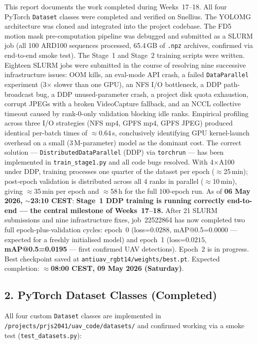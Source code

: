 This report documents the work completed during Weeks~17--18. All four
PyTorch \texttt{Dataset} classes were completed and verified on
Snellius. The YOLOMG architecture was cloned and integrated into the
project codebase. The FD5 motion mask pre-computation pipeline was
debugged and submitted as a SLURM job (all 100 ARD100 sequences
processed, 65.4\,GB of \texttt{.npz} archives, confirmed via
end-to-end smoke test). The Stage~1 and Stage~2 training scripts were
written. Eighteen SLURM jobs were submitted in the course of resolving
nine successive infrastructure issues: OOM kills, an eval-mode API
crash, a failed \texttt{DataParallel} experiment (3$\times$ slower
than one GPU), an NFS I/O bottleneck, a DDP path-broadcast bug, a DDP
unused-parameter crash, a project disk quota exhaustion, corrupt
JPEGs with a broken VideoCapture fallback, and an NCCL collective
timeout caused by rank-0-only validation blocking idle ranks. Empirical
profiling across three I/O strategies (NFS mp4, GPFS mp4, GPFS JPEG)
produced identical per-batch times of $\approx$0.64\,s,
conclusively identifying GPU kernel-launch overhead on a small
(3\,M-parameter) model as the dominant cost. The correct solution —
\texttt{DistributedDataParallel} (DDP) via \texttt{torchrun} — has
been implemented in \texttt{train\_stage1.py} and all code bugs
resolved. With 4$\times$A100 under DDP, training processes one quarter
of the dataset per epoch ($\approx$25\,min); post-epoch validation is
distributed across all 4 ranks in parallel ($\approx$10\,min), giving
$\approx$35\,min per epoch and $\approx$58\,h for the full 100-epoch run.
As of \textbf{06 May 2026, $\sim$23:10 CEST}: \textbf{Stage~1 DDP
training is running correctly end-to-end — the central milestone of
Weeks~17--18.} After 21 SLURM submissions and nine infrastructure
fixes, job~22522864 has now completed two full
epoch-plus-validation cycles:
epoch~0 (loss=$0.0288$, mAP@0.5=0.0000 — expected for a freshly
initialised model) and epoch~1 (loss=$0.0215$,
\textbf{mAP@0.5=0.0195} — first confirmed UAV detections).
Epoch~2 is in progress. Best checkpoint saved at
\texttt{antiuav\_rgbt14/weights/best.pt}.
Expected completion: $\approx$\textbf{08:00 CEST, 09 May 2026 (Saturday)}.

\subsection*{2. PyTorch Dataset Classes (Completed)}

All four custom \texttt{Dataset} classes are implemented in
\texttt{/projects/prjs2041/uav\_code/datasets/} and confirmed working
via a smoke test (\texttt{test\_datasets.py}):

